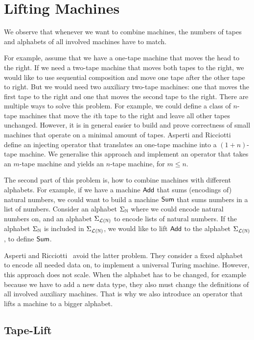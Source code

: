\chapter{Lifting Machines}
\label{chap:lifting}

We observe that whenever we want to combine machines, the numbers of tapes and alphabets of all involved machines have to match.

For example, assume that we have a one-tape machine that moves the head to the right.  If we need a two-tape machine that moves both tapes to the
right, we would like to use sequential composition and move one tape after the other tape to right.  But we would need two auxiliary two-tape
machines: one that moves the first tape to the right and one that moves the second tape to the right.  There are multiple ways to solve this problem.
For example, we could define a class of $n$-tape machines that move the $i$th tape to the right and leave all other tapes unchanged.  However, it is
in general easier to build and prove correctness of small machines that operate on a minimal amount of tapes.  Asperti and
Ricciotti~\cite{asperti2015} define an injecting operator that translates an one-tape machine into a $(1+n)$-tape machine.  We generalise this
approach and implement an operator that takes an $m$-tape machine and yields an $n$-tape machine, for $m \le n$.

The second part of this problem is, how to combine machines with different alphabets.  For example, if we have a machine $\mathsf{Add}$ that sums
(encodings of) natural numbers, we could want to build a machine $\mathsf{Sum}$ that sums numbers in a list of numbers.  Consider an alphabet
$\Sigma_{\mathbb{N}}$ where we could encode natural numbers on, and an alphabet $\Sigma_{\mathcal{L}(\mathbb{N})}$ to encode lists of natural numbers.  If the alphabet
$\Sigma_{\mathbb{N}}$ is included in $\Sigma_{\mathcal{L}(\mathbb{N})}$, we would like to lift $\mathsf{Add}$ to the alphabet $\Sigma_{\mathcal{L}(\mathbb{N})}$, to define $\mathsf{Sum}$.

Asperti and Ricciotti~\cite{asperti2015} avoid the latter problem.  They consider a fixed alphabet to encode all needed data on, to implement a
universal Turing machine.  However, this approach does not scale.  When the alphabet has to be changed, for example because we have to add a new data
type, they also must change the definitions of all involved auxiliary machines.  That is why we also introduce an operator that lifts a machine to a
bigger alphabet.


\section{Tape-Lift}
\label{sec:n-Lift}
%

